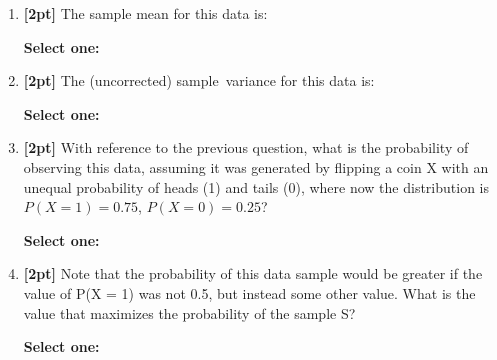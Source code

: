 \documentclass[12pt]{article}
\renewcommand{\circle}{\tikz\draw[black] (0,0) circle (1ex);}
\begin{document}
\begin{enumerate}
    \item \textbf{[2pt]} The sample mean for this data is:
    
    \textbf{Select one:}


    \item \textbf{[2pt]} The (uncorrected) sample variance for this data is:

    \textbf{Select one:}


    \item \textbf{[2pt]} With reference to the previous question, what is the probability of observing this data, assuming it was generated by flipping a coin X with an unequal probability of heads (1) and tails (0), where now the distribution is $P(X = 1) = 0.75$, $P(X = 0) = 0.25$?

    \textbf{Select one:}


    \item \textbf{[2pt]} Note that the probability of this data sample would be greater if the value of P(X = 1) was not 0.5, but instead some other value. What is the value that maximizes the probability of the sample S?

    \textbf{Select one:}



\end{enumerate}
\end{document}
